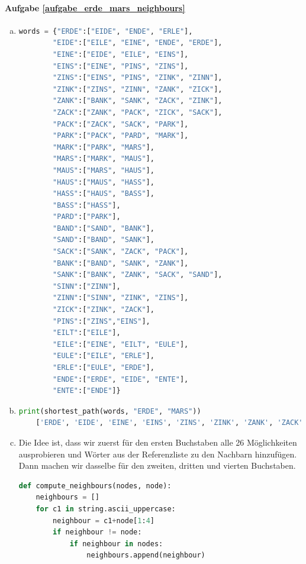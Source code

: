 \paragraph{Aufgabe \ref{aufgabe_erde_mars_neighbours}}
\begin{enumerate}[(a)]
    \item
    \begin{lstlisting}[language=Python]
    words = {"ERDE":["EIDE", "ENDE", "ERLE"],
        "EIDE":["EILE", "EINE", "ENDE", "ERDE"],
        "EINE":["EIDE", "EILE", "EINS"],
        "EINS":["EINE", "PINS", "ZINS"],
        "ZINS":["EINS", "PINS", "ZINK", "ZINN"],
        "ZINK":["ZINS", "ZINN", "ZANK", "ZICK"],
        "ZANK":["BANK", "SANK", "ZACK", "ZINK"],
        "ZACK":["ZANK", "PACK", "ZICK", "SACK"],
        "PACK":["ZACK", "SACK", "PARK"],
        "PARK":["PACK", "PARD", "MARK"],
        "MARK":["PARK", "MARS"],
        "MARS":["MARK", "MAUS"],
        "MAUS":["MARS", "HAUS"],
        "HAUS":["MAUS", "HASS"],
        "HASS":["HAUS", "BASS"],
        "BASS":["HASS"],
        "PARD":["PARK"],
        "BAND":["SAND", "BANK"],
        "SAND":["BAND", "SANK"],
        "SACK":["SANK", "ZACK", "PACK"],
        "BANK":["BAND", "SANK", "ZANK"],
        "SANK":["BANK", "ZANK", "SACK", "SAND"],
        "SINN":["ZINN"],
        "ZINN":["SINN", "ZINK", "ZINS"],
        "ZICK":["ZINK", "ZACK"],
        "PINS":["ZINS","EINS"],
        "EILT":["EILE"],
        "EILE":["EINE", "EILT", "EULE"],
        "EULE":["EILE", "ERLE"],
        "ERLE":["EULE", "ERDE"],
        "ENDE":["ERDE", "EIDE", "ENTE"],
        "ENTE":["ENDE"]}
    \end{lstlisting}
    \item
    \begin{lstlisting}[language=Python]
    print(shortest_path(words, "ERDE", "MARS"))
    ['ERDE', 'EIDE', 'EINE', 'EINS', 'ZINS', 'ZINK', 'ZANK', 'ZACK', 'PACK', 'PARK', 'MARK', 'MARS']
    \end{lstlisting}
    \item Die Idee ist, dass wir zuerst für den ersten Buchstaben alle 26 Möglichkeiten ausprobieren und Wörter aus der Referenzliste zu den Nachbarn hinzufügen. Dann machen wir dasselbe für den zweiten, dritten und vierten Buchstaben.
    \begin{lstlisting}[language=Python]
    def compute_neighbours(nodes, node):
    neighbours = []
    for c1 in string.ascii_uppercase:
        neighbour = c1+node[1:4]
        if neighbour != node:
            if neighbour in nodes:
                neighbours.append(neighbour)
                

\end{lstlisting}
\end{enumerate}
